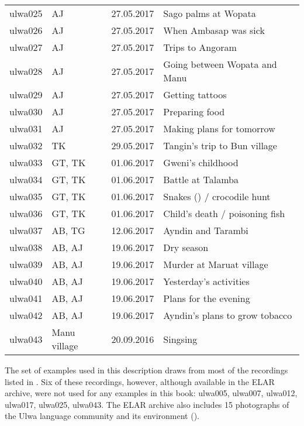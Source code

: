 \begin{xltabular}{\textwidth}{lllQ}
ulwa025 & AJ & 27.05.2017 & Sago palms at Wopata\\
ulwa026 & AJ & 27.05.2017 & When Ambasap was sick\\
ulwa027 & AJ & 27.05.2017 & Trips to Angoram\\
ulwa028 & AJ & 27.05.2017 & Going between Wopata and Manu\\
ulwa029 & AJ & 27.05.2017 & Getting tattoos\\
ulwa030 & AJ & 27.05.2017 & Preparing food\\
ulwa031 & AJ & 27.05.2017 & Making plans for tomorrow\\
ulwa032 & TK & 29.05.2017 & Tangin’s trip to Bun village\\
ulwa033 & GT, TK & 01.06.2017 & Gweni’s childhood\\
ulwa034 & GT, TK & 01.06.2017 & Battle at Talamba\\
ulwa035 & GT, TK & 01.06.2017 & Snakes () / crocodile hunt\\
ulwa036 & GT, TK & 01.06.2017 & Child’s death / poisoning fish\\
ulwa037 & AB, TG & 12.06.2017 & Ayndin and Tarambi\\
ulwa038 & AB, AJ & 19.06.2017 & Dry season\\
ulwa039 & AB, AJ & 19.06.2017 & Murder at Maruat village\\
ulwa040 & AB, AJ & 19.06.2017 & Yesterday’s activities\\
ulwa041 & AB, AJ & 19.06.2017 & Plans for the evening\\
ulwa042 & AB, AJ & 19.06.2017 & Ayndin’s plans to grow tobacco\\
ulwa043 & Manu village & 20.09.2016 & Singsing\\
\end{xltabular}

The set of examples used in this description draws from most of the recordings listed in . Six of these recordings, however, although available in the ELAR archive, were not used for any examples in this book: ulwa005, ulwa007, ulwa012, ulwa017, ulwa025, ulwa043. The ELAR archive also includes 15 photographs of the Ulwa language community and its environment ().

